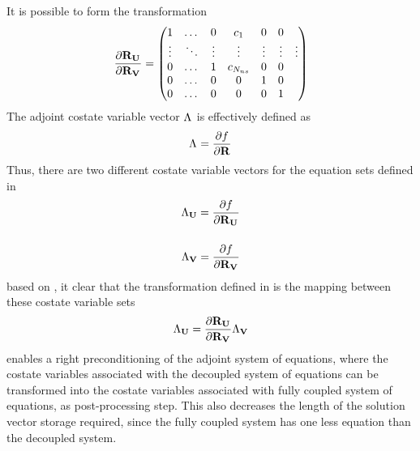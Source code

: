It is possible to form the transformation
\begin{equation}
  \frac{\partial \mathbf R_{{\mathbf U}_{}}}{\partial \mathbf R_{{\mathbf V}_{}}} =
  \begin{pmatrix}
    1      & \dots  & 0 & c_1        & 0 & 0 \\
    \vdots & \ddots & \vdots            & \vdots & \vdots & \vdots & \vdots \\
    0      & \dots  & 1 & c_{N_{ns}} & 0 & 0 \\
    0      & \dots  & 0 & 0          & 1 & 0 \\
    0      & \dots  & 0 & 0          & 0 & 1 \\
  \end{pmatrix}
  \label{drudrv}
\end{equation}
The adjoint costate variable vector $\Lambda_{}$ is effectively defined as
\begin{equation}
  \Lambda_{} = \frac{\partial f}{\partial \mathbf R}
  \label{adj-lam-dfdr}
\end{equation}
Thus, there are two different costate variable vectors for the equation sets
defined in 
\begin{align}
  \Lambda_{\mathbf U} = \frac{\partial f}{\partial \mathbf R_{{\mathbf U}_{}}}
  \label{adj-lam-ru} \\[12pt]
  \Lambda_{\mathbf V} = \frac{\partial f}{\partial \mathbf R_{{\mathbf V}_{}}}
  \label{adj-lam-rv}
\end{align}
based on , it clear that the transformation
defined in  is the mapping between these costate variable sets
\begin{equation}
  \Lambda_{\mathbf U} = \frac{\partial \mathbf R_{{\mathbf U}_{}}}{\partial \mathbf R_{{\mathbf V}_{}}} \Lambda_{\mathbf V}
  \label{adj-ru-to-rv}
\end{equation}
 enables a right preconditioning of the adjoint system of
equations, where the costate variables associated with the decoupled system of
equations can be transformed into the costate variables associated with fully
coupled system of equations, as post-processing step.  This also decreases the
length of the solution vector storage required, since the fully coupled system
has one less equation than the decoupled system.

